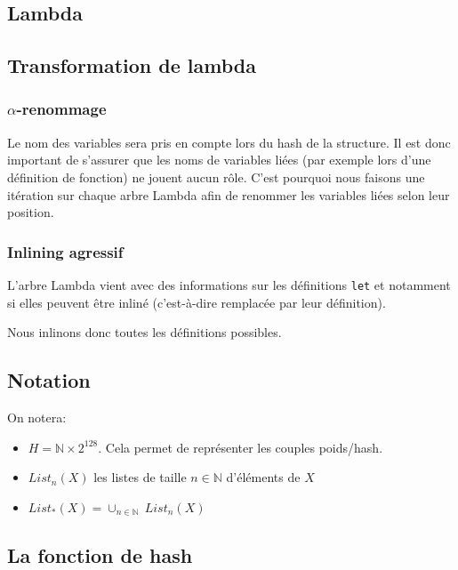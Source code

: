 
\subsection{Lambda}
\label{sec:lambda}



\subsection{Transformation de lambda}
\label{sec:lambda-normalization}

\subsubsection{$\alpha$-renommage}

Le nom des variables sera pris en compte lors du hash de la
structure. Il est donc important de s'assurer que les noms de
variables liées (par exemple lors d'une définition de fonction) ne
jouent aucun rôle.  C'est pourquoi nous faisons une itération sur
chaque arbre Lambda afin de renommer les variables liées selon leur
position.

\subsubsection{Inlining agressif}

L'arbre Lambda vient avec des informations sur les définitions
\verb|let| et notamment si elles peuvent être inliné (c'est-à-dire
remplacée par leur définition).

Nous inlinons donc toutes les définitions possibles.

\subsection{Notation}
On notera:

\begin{itemize}
	\item $H = \mathbb{N} \times 2^{128}$. Cela permet de représenter les couples poids/hash.
	\item $List_n(X)$ les listes de taille $n \in \mathbb{N}$ d'éléments de $X$
	\item $List_*(X) = \cup_{n\in\mathbb{N}}\ List_n(X)$
\end{itemize}

\subsection{La fonction de hash}

